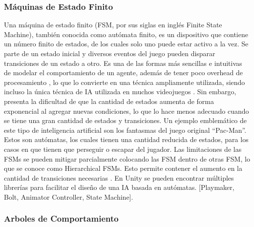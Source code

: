 \documentclass{article}
\begin{document}
\subsubsection{Máquinas de Estado Finito}
Una máquina de estado finito (FSM, por sus siglas en inglés Finite State Machine), también conocida como autómata finito, es un dispositivo que contiene un número finito de estados, de los cuales solo uno puede estar activo a la vez. Se parte de un estado inicial y diversos eventos del juego pueden disparar transiciones de un estado a otro. Es una de las formas más sencillas e intuitivas de modelar el comportamiento de un agente, además de tener poco overhead de procesamiento \cite{programming_game_ai_by_example}, lo que lo convierte en una técnica ampliamente utilizada, siendo incluso la única técnica de IA utilizada en muchos videojuegos \cite{unity_artificial_intelligence_programming}. Sin embargo, presenta la dificultad de que la cantidad de estados aumenta de forma exponencial al agregar nuevas condiciones, lo que lo hace menos adecuado cuando se tiene una gran cantidad de estados y transiciones.
Un ejemplo emblemático de este tipo de inteligencia artificial son los fantasmas del juego original “Pac-Man”. Estos son autómatas, los cuales tienen una cantidad reducida de estados, para los casos en que tienen que perseguir o escapar del jugador.
Las limitaciones de las FSMs se pueden mitigar parcialmente colocando las FSM dentro de otras FSM, lo que se conoce como Hierarchical FSMs. Esto permite contener el aumento en la cantidad de transiciones necesarias \cite{finite_state_machine_in_game_development}.
En Unity se pueden encontrar múltiples librerías para facilitar el diseño de una IA basada en autómatas. [Playmaker, Bolt, Animator Controller, State Machine].

\subsubsection{Arboles de Comportamiento}
\end{document}
